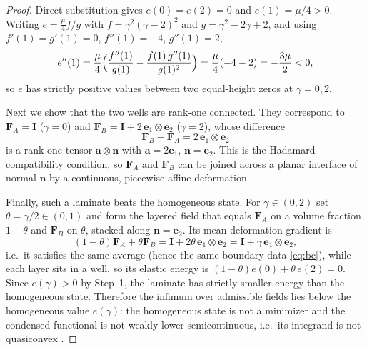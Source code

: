 \documentclass[12pt]{article}
\theoremstyle{plain}
\theoremstyle{definition}
\newcommand{\bF}{\bm{F}}
\newcommand{\bI}{\bm{I}}
\begin{document}
\begin{proof}
Direct substitution gives $e(0)=e(2)=0$ and $e(1)=\mu/4>0$. Writing
$e=\tfrac{\mu}{4}f/g$ with $f=\gamma^{2}(\gamma-2)^{2}$ and
$g=\gamma^{2}-2\gamma+2$, and using $f'(1)=g'(1)=0$, $f''(1)=-4$, $g''(1)=2$,
\begin{equation}\label{eq:eprime2}
  e''(1)=\frac{\mu}{4}\Bigl(\frac{f''(1)}{g(1)}-\frac{f(1)\,g''(1)}{g(1)^{2}}\Bigr)
  =\frac{\mu}{4}(-4-2)=-\frac{3\mu}{2}<0 ,
\end{equation}
so $e$ has strictly positive values between two equal-height zeros at
$\gamma=0,2$.

Next we show that the two wells are rank-one connected. They correspond to
$\bF_{\!A}=\bI$ ($\gamma=0$) and
$\bF_{\!B}=\bI+2\,\bm{e}_1\otimes\bm{e}_2$ ($\gamma=2$), whose difference
\begin{equation}\label{eq:rank-one}
  \bF_{\!B}-\bF_{\!A}=2\,\bm{e}_1\otimes\bm{e}_2
\end{equation}
is a rank-one tensor $\bm{a}\otimes\bm{n}$ with $\bm{a}=2\bm{e}_1$,
$\bm{n}=\bm{e}_2$. This is the Hadamard compatibility condition, so $\bF_{\!A}$
and $\bF_{\!B}$ can be joined across a planar interface of normal $\bm{n}$ by a
continuous, piecewise-affine deformation.

Finally, such a laminate beats the homogeneous state. For $\gamma\in(0,2)$ set
$\theta=\gamma/2\in(0,1)$ and form the layered field that
equals $\bF_{\!A}$ on a volume fraction $1-\theta$ and $\bF_{\!B}$ on $\theta$,
stacked along $\bm{n}=\bm{e}_2$. Its mean deformation gradient is
\begin{equation}\label{eq:laminate-mean}
  (1-\theta)\bF_{\!A}+\theta\bF_{\!B}
  =\bI+2\theta\,\bm{e}_1\otimes\bm{e}_2
  =\bI+\gamma\,\bm{e}_1\otimes\bm{e}_2 ,
\end{equation}
i.e.\ it satisfies the same average (hence the same boundary data
\eqref{eq:bc}), while each layer sits in a well, so its elastic energy is
$(1-\theta)e(0)+\theta\,e(2)=0$. Since $e(\gamma)>0$ by Step~1, the laminate has
strictly smaller energy than the homogeneous state. Therefore the infimum over
admissible fields lies below the homogeneous value $e(\gamma)$: the homogeneous state is not a minimizer and the condensed functional is not weakly lower semicontinuous, i.e.\ its integrand is not quasiconvex \citep{dacorogna2008direct}. 
\end{proof}
\end{document}
